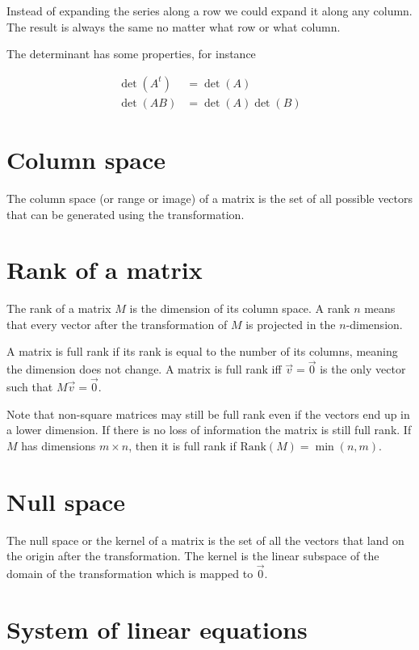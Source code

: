 \documentclass[a4paper]{article}
\begin{document}
Instead of expanding the series along a row we could expand it along any column. \\
The result is always the same no matter what row or what column.

The determinant has some properties, for instance

\begin{align*}
    \det(A^t)&=\det(A) \\
    \det(AB)&=\det(A)\det(B)
\end{align*}

\pagebreak

\section{Column space}

The column space (or range or image) of a matrix is the
set of all possible vectors that can be generated using the transformation.

\section{Rank of a matrix}

The rank of a matrix \(M\) is the dimension of its column space.
A rank \(n\) means that every vector after the transformation of \(M\)
is projected in the \(n\)-dimension.

A matrix is full rank if its rank is equal to the number of its columns, meaning
the dimension does not change.
A matrix is full rank iff \(\vec{v}=\vec{0}\) is the only vector such that \(M\vec{v}=\vec{0}\).

Note that non-square matrices may still be full rank even if the vectors end up in a lower dimension.
If there is no loss of information the matrix is still full rank.
If \(M\) has dimensions \(m \times n\), then it is full rank if \(\text{Rank}(M)=\min(n,m)\).

\section{Null space}

The null space or the kernel of a matrix is the set of all the vectors that land on the origin
after the transformation.
The kernel is the linear subspace of the domain of the transformation which is mapped to \(\vec{0}\).

\pagebreak

\section{System of linear equations}
\end{document}
